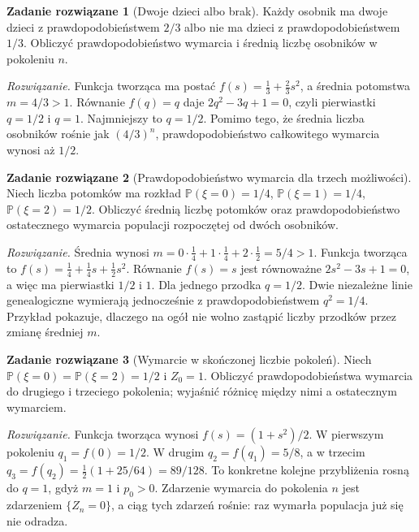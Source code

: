\documentclass[11pt,a4paper,oneside]{report}
\numberwithin{equation}{chapter}
\theoremstyle{plain}
\theoremstyle{definition}
\newtheorem{zadanie}{Zadanie rozwiązane}[chapter]
\theoremstyle{remark}
\newcommand{\Prob}{\mathbb{P}}
\begin{document}
\begin{zadanie}[Dwoje dzieci albo brak]
Każdy osobnik ma dwoje dzieci z prawdopodobieństwem $2/3$
albo nie ma dzieci z prawdopodobieństwem $1/3$.
Obliczyć prawdopodobieństwo wymarcia i średnią liczbę
osobników w pokoleniu $n$.

\emph{Rozwiązanie.} Funkcja tworząca ma postać
$f(s)=\frac13+\frac23s^2$, a średnia potomstwa
$m=4/3>1$. Równanie $f(q)=q$ daje
$2q^2-3q+1=0$, czyli pierwiastki $q=1/2$ i $q=1$.
Najmniejszy to $q=1/2$. Pomimo tego, że średnia
liczba osobników rośnie jak $(4/3)^n$, prawdopodobieństwo
całkowitego wymarcia wynosi aż $1/2$.
\end{zadanie}


\begin{zadanie}[Prawdopodobieństwo wymarcia dla trzech możliwości]
Niech liczba potomków ma rozkład
$\Prob(\xi=0)=1/4$, $\Prob(\xi=1)=1/4$,
$\Prob(\xi=2)=1/2$. Obliczyć średnią liczbę potomków
oraz prawdopodobieństwo ostatecznego wymarcia populacji
rozpoczętej od dwóch osobników.

\emph{Rozwiązanie.} Średnia wynosi
$m=0\cdot\tfrac14+1\cdot\tfrac14+2\cdot\tfrac12=5/4>1$.
Funkcja tworząca to
$f(s)=\tfrac14+\tfrac14s+\tfrac12s^2$. Równanie
$f(s)=s$ jest równoważne $2s^2-3s+1=0$,
a więc ma pierwiastki $1/2$ i $1$. Dla jednego przodka
$q=1/2$. Dwie niezależne linie genealogiczne wymierają
jednocześnie z prawdopodobieństwem $q^2=1/4$.
Przykład pokazuje, dlaczego na ogół nie wolno zastąpić
liczby przodków przez zmianę średniej $m$.
\end{zadanie}


\begin{zadanie}[Wymarcie w skończonej liczbie pokoleń]
Niech $\Prob(\xi=0)=\Prob(\xi=2)=1/2$ i $Z_0=1$.
Obliczyć prawdopodobieństwa wymarcia do drugiego i trzeciego
pokolenia; wyjaśnić różnicę między nimi a ostatecznym wymarciem.

\emph{Rozwiązanie.} Funkcja tworząca wynosi
$f(s)=(1+s^2)/2$. W pierwszym pokoleniu
$q_1=f(0)=1/2$. W drugim $q_2=f(q_1)=5/8$,
a w trzecim $q_3=f(q_2)=\tfrac12(1+25/64)=89/128$.
To konkretne kolejne przybliżenia rosną do $q=1$,
gdyż $m=1$ i $p_0>0$. Zdarzenie wymarcia do pokolenia
$n$ jest zdarzeniem $\{Z_n=0\}$, a ciąg tych zdarzeń
rośnie: raz wymarła populacja już się nie odradza.
\end{zadanie}
\end{document}
